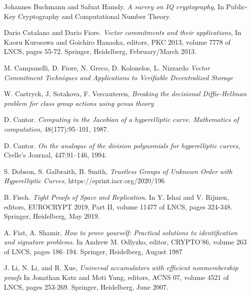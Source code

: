 \documentclass[11pt, lettersize, notitlepage, leqno, footskip=0.6cm]{article}
\newcommand{\noin}{\noindent}
\numberwithin{equation}{section}
\begin{document}
\noin [BH01] Johannes Buchmann and Safuat Hamdy. \textit{A survey on IQ cryptography}, In Public-Key Cryptography and Computational Number Theory. \vspace{0.1cm}

\noin [CF13] Dario Catalano and Dario Fiore. \textit{Vector commitments and their applications}, In Kaoru Kurosawa and Goichiro Hanaoka, editors, PKC 2013, volume 7778 of LNCS, pages 55-72. Springer, Heidelberg, February/March 2013.

\noindent [CFGKN20] M. Campanelli, D. Fiore, N. Greco, D. Kolonelos, L. Nizzardo \textit{Vector Commitment Techniques and Applications to Verifiable Decentralized Storage} \vspace{0.1cm}

\noin [CSV20] W. Castryck, J, Sotakova, F. Vercauteren, \textit{Breaking the decisional Diffie-Hellman problem for class group actions using genus theory}\vspace{0.1cm}

\noindent [Can87] D. Cantor. \textit{Computing in the Jacobian of a hyperelliptic curve. Mathematics of computation}, 48(177):95–101, 1987.\vspace{0.1cm}

\noindent [Can94] D. Cantor. \textit{On the analogue of the division polynomials for hyperelliptic curves}, Crelle's Journal, 447:91–146, 1994.\vspace{0.1cm}


\noindent [DGS20] S. Dobson, S. Galbraith, B. Smith, \textit{Trustless Groups of Unknown Order with Hyperelliptic Curves}, https://eprint.iacr.org/2020/196\vspace{0.1cm}

\noin [Fis18] B. Fisch. \textit{Tight Proofs of Space and Replication}. In Y. Ishai and V. Rijmen, editors, EUROCRYPT 2019, Part II, volume 11477 of LNCS, pages 324-348. Springer, Heidelberg, May 2019.

\noindent [FS87] A. Fiat, A. Shamir, \textit{How to prove yourself: Practical solutions to identification and signature problems.} In Andrew M. Odlyzko, editor, CRYPTO’86, volume 263 of LNCS, pages 186–194. Springer, Heidelberg, August 1987\vspace{0.1cm}

\noin [LLX07] J. Li, N. Li, and R. Xue,  \textit{Universal accumulators with efficient nonmembership proofs} In Jonathan Katz and Moti Yung, editors, ACNS 07, volume 4521 of LNCS, pages 253-269. Springer, Heidelberg, June 2007.
\end{document}
